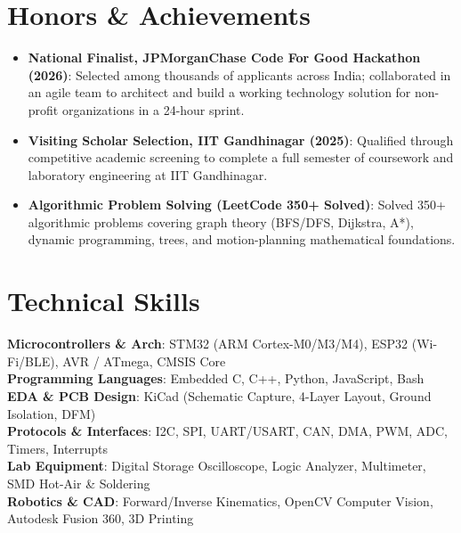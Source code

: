 \documentclass[letterpaper,10pt]{article}
\newcommand{\resumeItem}[1]{
  \item\small{
    {#1 \vspace{-2pt}}
  }
}
\newcommand{\resumeSubHeadingListStart}{\begin{itemize}[leftmargin=0.15in, label={}]}
\newcommand{\resumeSubHeadingListEnd}{\end{itemize}}
\begin{document}
\section{Honors \& Achievements}
  \resumeSubHeadingListStart
    \resumeItem{\textbf{National Finalist, JPMorganChase Code For Good Hackathon (2026)}: Selected among thousands of applicants across India; collaborated in an agile team to architect and build a working technology solution for non-profit organizations in a 24-hour sprint.}
    \resumeItem{\textbf{Visiting Scholar Selection, IIT Gandhinagar (2025)}: Qualified through competitive academic screening to complete a full semester of coursework and laboratory engineering at IIT Gandhinagar.}
    \resumeItem{\textbf{Algorithmic Problem Solving (LeetCode 350+ Solved)}: Solved 350+ algorithmic problems covering graph theory (BFS/DFS, Dijkstra, A*), dynamic programming, trees, and motion-planning mathematical foundations.}
  \resumeSubHeadingListEnd


\section{Technical Skills}
 \begin{itemize}[leftmargin=0.15in, label={}]
    \small{\item{
     \textbf{Microcontrollers \& Arch}{: STM32 (ARM Cortex-M0/M3/M4), ESP32 (Wi-Fi/BLE), AVR / ATmega, CMSIS Core} \\
     \textbf{Programming Languages}{: Embedded C, C++, Python, JavaScript, Bash} \\
     \textbf{EDA \& PCB Design}{: KiCad (Schematic Capture, 4-Layer Layout, Ground Isolation, DFM)} \\
     \textbf{Protocols \& Interfaces}{: I2C, SPI, UART/USART, CAN, DMA, PWM, ADC, Timers, Interrupts} \\
     \textbf{Lab Equipment}{: Digital Storage Oscilloscope, Logic Analyzer, Multimeter, SMD Hot-Air \& Soldering} \\
     \textbf{Robotics \& CAD}{: Forward/Inverse Kinematics, OpenCV Computer Vision, Autodesk Fusion 360, 3D Printing}
    }}
 \end{itemize}

\end{document}
